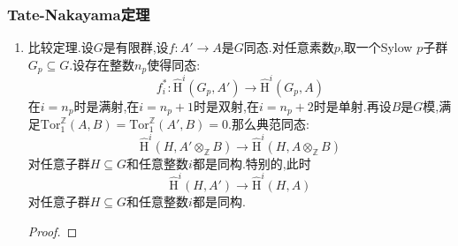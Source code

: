 \subsubsection{Tate-Nakayama定理}
\begin{enumerate}
	\item 比较定理.设$G$是有限群,设$f:A'\to A$是$G$同态.对任意素数$p$,取一个Sylow $p$子群$G_p\subseteq G$.设存在整数$n_p$使得同态:
	$$f_i^*:\widehat{\mathrm{H}}^i(G_p,A')\to\widehat{\mathrm{H}}^i(G_p,A)$$
	在$i=n_p$时是满射,在$i=n_p+1$时是双射,在$i=n_p+2$时是单射.再设$B$是$G$模,满足$\mathrm{Tor}^{\mathbb{Z}}_1(A,B)=\mathrm{Tor}^{\mathbb{Z}}_1(A',B)=0$.那么典范同态:
	$$\widehat{\mathrm{H}}^i(H,A'\otimes_{\mathbb{Z}}B)\to\widehat{\mathrm{H}}^i(H,A\otimes_{\mathbb{Z}}B)$$
	对任意子群$H\subseteq G$和任意整数$i$都是同构.特别的,此时
	$$\widehat{\mathrm{H}}^i(H,A')\to\widehat{\mathrm{H}}^i(H,A)$$
	对任意子群$H\subseteq G$和任意整数$i$都是同构.
	\begin{proof}
		

\end{proof}
\end{enumerate}
